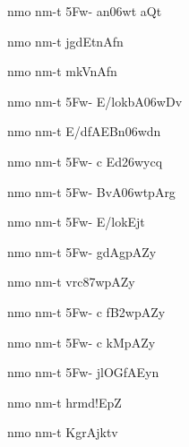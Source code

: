 \ujvers\dnnemsloka 
{\dn nmo nm-t\? \35Fw- an\306wt aQt\?}
\dontdisplaylinenum

\dnnemslokab 
{\dn nmo nm-t\? jgdEt\0nAfn\? \dandadn\dontdisplaylinenum}

\dnnemslokac 
{\dn nmo nm-t\? mk\4VnAfn\?}
\dontdisplaylinenum

\dnnemslokad 
{\dn nmo nm-t\? \35Fw- E/lokbA\306wDv\? \vegdn\dontdisplaylinenum}


\ujvers\dnnemsloka 
{\dn nmo nm-t\? E/dfAEBn\306wdn\?}
\dontdisplaylinenum

\dnnemslokab 
{\dn nmo nm-t\? \35Fw- c Ed\326wycq\? \dandadn\dontdisplaylinenum}

\dnnemslokac 
{\dn nmo nm-t\? \35Fw- BvA\306wtpArg\?}
\dontdisplaylinenum

\dnnemslokad 
{\dn nmo nm-t\? \35Fw- E/lokEjt\? \vegdn\dontdisplaylinenum}


\ujvers\dnnemsloka 
{\dn nmo nm-t\? \35Fw- gdAg\5pAZy\?}
\dontdisplaylinenum

\dnnemslokab 
{\dn nmo nm-t\? vrc\387wpAZy\? \dandadn\dontdisplaylinenum}

\dnnemslokac 
{\dn nmo nm-t\? \35Fw- c f\3B2wpAZy\?}
\dontdisplaylinenum

\dnnemslokad 
{\dn nmo nm-t\? \35Fw- c kMpAZy\? \vegdn\dontdisplaylinenum}


\ujvers\dnnemsloka 
{\dn nmo nm-t\? \35Fw- jlOGfAEyn\?}
\dontdisplaylinenum

\dnnemslokab 
{\dn nmo nm-t\? hrmd\0!EpZ\? \dandadn\dontdisplaylinenum}

\dnnemslokac 
{\dn nmo nm-t\? KgrAjk\?tv\?}
\dontdisplaylinenum

